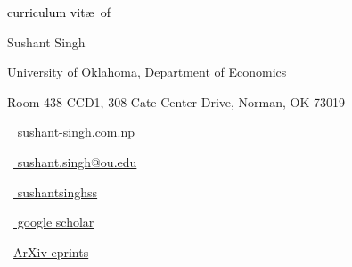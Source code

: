 \begin{scriptsize}
	 \textcolor{black}{curriculum vit\ae~of}
\end{scriptsize}

\vspace*{-0.10em}
\begin{Large} 
	Sushant Singh
\end{Large}

\vspace*{0.25em}
\begin{scshape}
	\begin{footnotesize}
		  \textcolor{highlight2}{University of Oklahoma, Department of Economics}
		  
		  \vspace*{-1ex}
		  \textcolor{highlight2}{Room 438 CCD1, 308 Cate Center Drive,
Norman, OK 73019}
	\end{footnotesize}
\end{scshape}
\vspace*{0.4cm}

\begin{footnotesize}
	\begin{tiny}\faHome\end{tiny}~\href{https://www.sushant-singh.com.np/}{
		sushant-singh.com.np
	}
	\quad \begin{tiny}\faEnvelope[regular]\end{tiny}~\href{mailto:sushant.singh@ou.edu}{%
		sushant.singh@ou.edu
		}
		
		
	\quad 
	\begin{tiny}\faLinkedinIn\end{tiny}~\href{https://www.linkedin.com/in/sushantsinghss/}{
		sushantsinghss
	}
	\quad 
	\begin{tiny}\faGraduationCap\end{tiny}~\href{https://scholar.google.com/citations?user=USERID&hl=en}{
		 google scholar
		}
\quad
\begin{tiny}\aiarXiv\end{tiny}~\href{https://arxiv.org/user/}{ArXiv eprints}

\end{footnotesize}
